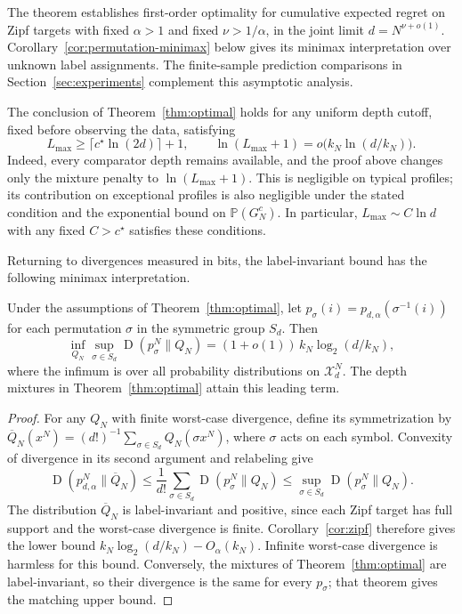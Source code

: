 \documentclass[anon]{alt2027}
\newcommand{\Xd}{\mathcal{X}_d}
\newcommand{\Prob}{\mathbb{P}}
\newcommand{\cstar}{c^{\star}}
\newcommand{\Lmax}{L_{\max}}
\newcommand{\KL}{\operatorname{D}}
\begin{document}
The theorem establishes first-order optimality for cumulative expected regret on Zipf targets with fixed $\alpha>1$ and fixed $\nu>1/\alpha$, in the joint limit $d=N^{\nu+o(1)}$. Corollary~\ref{cor:permutation-minimax} below gives its minimax interpretation over unknown label assignments. The finite-sample prediction comparisons in Section~\ref{sec:experiments} complement this asymptotic analysis.

\begin{remark}
\label{rem:larger-cutoffs}
The conclusion of Theorem~\ref{thm:optimal} holds for any uniform depth cutoff, fixed before observing the data, satisfying
\[
\Lmax\ge\lceil\cstar\ln(2d)\rceil+1,
\qquad \ln(\Lmax+1)=o\bigl(k_N\ln(d/k_N)\bigr).
\]
Indeed, every comparator depth remains available, and the proof above changes only the mixture penalty to $\ln(\Lmax+1)$. This is negligible on typical profiles; its contribution on exceptional profiles is also negligible under the stated condition and the exponential bound on $\Prob(G_N^c)$. In particular, $\Lmax\sim C\ln d$ with any fixed $C>\cstar$ satisfies these conditions.
\end{remark}

Returning to divergences measured in bits, the label-invariant bound has the following minimax interpretation.
\begin{corollary}
\label{cor:permutation-minimax}
Under the assumptions of Theorem~\ref{thm:optimal}, let $p_\sigma(i)=p_{d,\alpha}(\sigma^{-1}(i))$ for each permutation $\sigma$ in the symmetric group $S_d$. Then
\[
\inf_{Q_N}\sup_{\sigma\in S_d}\KL(p_\sigma^N\|Q_N)
=(1+o(1))\,k_N\log_2(d/k_N),
\]
where the infimum is over all probability distributions on $\Xd^N$. The depth mixtures in Theorem~\ref{thm:optimal} attain this leading term.
\end{corollary}
\begin{proof}
For any $Q_N$ with finite worst-case divergence, define its symmetrization by $\overline Q_N(x^N)=(d!)^{-1}\sum_{\sigma\in S_d}Q_N(\sigma x^N)$, where $\sigma$ acts on each symbol. Convexity of divergence in its second argument and relabeling give
\[
\KL(p_{d,\alpha}^N\|\overline Q_N)
\le\frac1{d!}\sum_{\sigma\in S_d}\KL(p_\sigma^N\|Q_N)
\le\sup_{\sigma\in S_d}\KL(p_\sigma^N\|Q_N).
\]
The distribution $\overline Q_N$ is label-invariant and positive, since each Zipf target has full support and the worst-case divergence is finite. Corollary~\ref{cor:zipf} therefore gives the lower bound $k_N\log_2(d/k_N)-O_\alpha(k_N)$. Infinite worst-case divergence is harmless for this bound. Conversely, the mixtures of Theorem~\ref{thm:optimal} are label-invariant, so their divergence is the same for every $p_\sigma$; that theorem gives the matching upper bound.
\end{proof}
\end{document}
